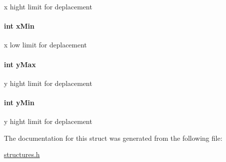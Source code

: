 x hight limit for deplacement \hypertarget{structplatform_aa91afe2b50db2f2fc786f4caf9f16f69}{
\paragraph[{x\-Min}]{\setlength{\rightskip}{0pt plus 5cm}int x\-Min}}\label{structplatform_aa91afe2b50db2f2fc786f4caf9f16f69}
x low limit for deplacement \hypertarget{structplatform_a7ca443cbb568e95510880b6ec54dbe5e}{
\paragraph[{y\-Max}]{\setlength{\rightskip}{0pt plus 5cm}int y\-Max}}\label{structplatform_a7ca443cbb568e95510880b6ec54dbe5e}
y hight limit for deplacement \hypertarget{structplatform_abd0259c29e89b8f4ee318478bf207cf8}{
\paragraph[{y\-Min}]{\setlength{\rightskip}{0pt plus 5cm}int y\-Min}}\label{structplatform_abd0259c29e89b8f4ee318478bf207cf8}
y hight limit for deplacement 

The documentation for this struct was generated from the following file\-:\begin{DoxyCompactItemize}
\item 
\hyperlink{structures_8h}{structures.\-h}\end{DoxyCompactItemize}
